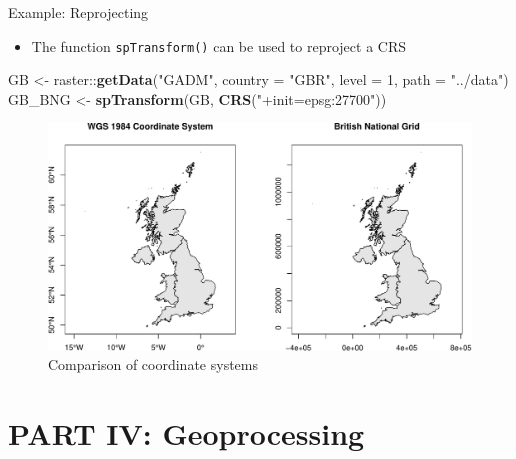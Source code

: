 \documentclass[10pt,ignorenonframetext,]{beamer}
\newenvironment{Shaded}{\begin{snugshade}}{\end{snugshade}}
\newcommand{\KeywordTok}[1]{\textcolor[rgb]{0.13,0.29,0.53}{\textbf{{#1}}}}
\newcommand{\DataTypeTok}[1]{\textcolor[rgb]{0.13,0.29,0.53}{{#1}}}
\newcommand{\DecValTok}[1]{\textcolor[rgb]{0.00,0.00,0.81}{{#1}}}
\newcommand{\StringTok}[1]{\textcolor[rgb]{0.31,0.60,0.02}{{#1}}}
\newcommand{\NormalTok}[1]{{#1}}
\providecommand{\tightlist}{%
  \setlength{\itemsep}{0pt}\setlength{\parskip}{0pt}}
\begin{document}
\begin{frame}[fragile]{Example: Reprojecting}

\begin{itemize}
\tightlist
\item
  The function \texttt{spTransform()} can be used to reproject a CRS
\end{itemize}

\begin{Shaded}
\begin{Highlighting}[]
\NormalTok{GB <-}\StringTok{ }\NormalTok{raster::}\KeywordTok{getData}\NormalTok{(}\StringTok{"GADM"}\NormalTok{, }\DataTypeTok{country =} \StringTok{"GBR"}\NormalTok{, }\DataTypeTok{level =} \DecValTok{1}\NormalTok{, }
    \DataTypeTok{path =} \StringTok{"../data"}\NormalTok{)}
\NormalTok{GB_BNG <-}\StringTok{ }\KeywordTok{spTransform}\NormalTok{(GB, }\KeywordTok{CRS}\NormalTok{(}\StringTok{"+init=epsg:27700"}\NormalTok{))}
\end{Highlighting}
\end{Shaded}

\begin{figure}

{\centering \includegraphics[width=0.8\linewidth]{SpatialDataLecture_files/figure-beamer/unnamed-chunk-31-1} 

}

\caption{Comparison of coordinate systems}\label{fig:unnamed-chunk-31}
\end{figure}

\end{frame}

\section{PART IV: Geoprocessing}\label{part-iv-geoprocessing}
\end{document}
